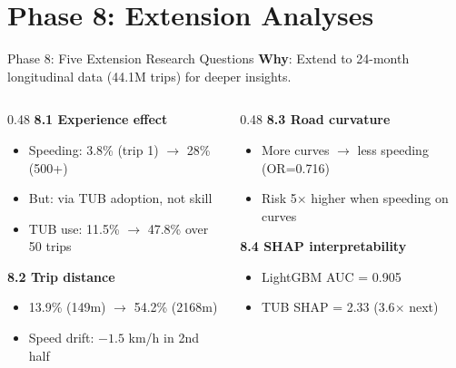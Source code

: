 \documentclass[aspectratio=169, 11pt]{beamer}
\begin{document}
\section{Phase 8: Extension Analyses}

\begin{frame}{Phase 8: Five Extension Research Questions}
\textbf{Why}: Extend to 24-month longitudinal data (44.1M trips) for deeper insights.

\begin{columns}[T]
\begin{column}{0.48\textwidth}
\textbf{8.1 Experience effect}
\begin{itemize}
\item Speeding: 3.8\% (trip 1) $\to$ 28\% (500+)
\item \alert{But}: via TUB adoption, not skill
\item TUB use: 11.5\% $\to$ 47.8\% over 50 trips
\end{itemize}
\vspace{0.1cm}
\textbf{8.2 Trip distance}
\begin{itemize}
\item 13.9\% (149m) $\to$ 54.2\% (2168m)
\item Speed drift: $-1.5$ km/h in 2nd half
\end{itemize}
\end{column}
\begin{column}{0.48\textwidth}
\textbf{8.3 Road curvature}
\begin{itemize}
\item More curves $\to$ less speeding (OR=0.716)
\item Risk 5$\times$ higher when speeding on curves
\end{itemize}
\vspace{0.1cm}
\textbf{8.4 SHAP interpretability}
\begin{itemize}
\item LightGBM AUC = 0.905
\item TUB SHAP = 2.33 (3.6$\times$ next)
\end{itemize}
\end{column}
\end{columns}
\end{frame}
\end{document}
